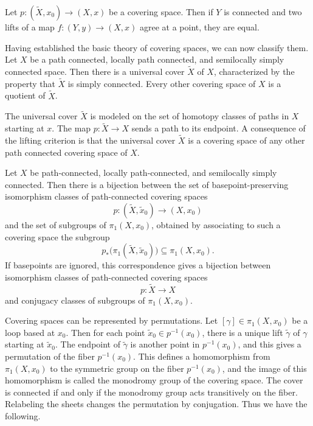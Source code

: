\documentclass[12pt]{article}
\begin{document}
\begin{theorem}
    Let $p: (\tilde X, x_0) \to (X, x)$ be a covering space. Then if $Y$ is connected and two lifts of a map $f: (Y,y) \to (X,x)$ agree at a point, they are equal.
\end{theorem}

Having established the basic theory of covering spaces, we can now classify them. Let $X$ be a path connected, locally path connected, and semilocally simply connected space. Then there is a universal cover $\tilde X$ of $X$, characterized by the property that $\tilde X$ is simply connected. Every other covering space of $X$ is a quotient of $\tilde X$.

The universal cover $\tilde X$ is modeled on the set of homotopy classes of paths in $X$ starting at $x$. The map $p : \tilde X \to X$ sends a path to its endpoint. A consequence of the lifting criterion is that the universal cover $\tilde X$ is a covering space of any other path connected covering space of $X$.

\begin{theorem}
    Let $X$ be path-connected, locally path-connected, and semilocally simply connected.
    Then there is a bijection between the set of basepoint-preserving isomorphism classes of path-connected covering spaces
    \[
        p:(\widetilde X,\widetilde x_0)\to (X,x_0)
    \]
    and the set of subgroups of $\pi_1(X,x_0)$, obtained by associating to such a covering space the subgroup
    \[
        p_*\bigl(\pi_1(\widetilde X,\widetilde x_0)\bigr)
        \subseteq \pi_1(X,x_0).
    \]
    If basepoints are ignored, this correspondence gives a bijection between isomorphism classes of path-connected covering spaces
    \[
        p:\widetilde X\to X
    \]
    and conjugacy classes of subgroups of $\pi_1(X,x_0)$.
\end{theorem}

Covering spaces can be represented by permutations. Let $[\gamma]\in\pi_1(X,x_0)$ be a loop based at $x_0$. Then for each point $\tilde x_0\in p^{-1}(x_0)$, there is a unique lift $\tilde \gamma$ of $\gamma$ starting at $\tilde x_0$. The endpoint of $\tilde \gamma$ is another point in $p^{-1}(x_0)$, and this gives a permutation of the fiber $p^{-1}(x_0)$. This defines a homomorphism from $\pi_1(X,x_0)$ to the symmetric group on the fiber $p^{-1}(x_0)$, and the image of this homomorphism is called the monodromy group of the covering space. The cover is connected if and only if the monodromy group acts transitively on the fiber. Relabeling the sheets changes the permutation by conjugation. Thus we have the following.
\end{document}
